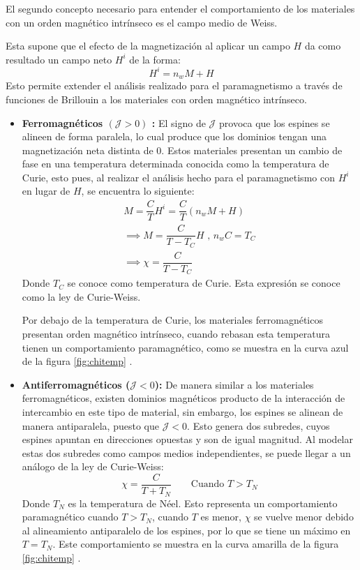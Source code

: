 \documentclass[../main.tex]{subfiles}
\begin{document}
El segundo concepto necesario para entender el comportamiento de los materiales con un orden magnético intrínseco es el campo medio de Weiss.

Esta supone que el efecto de la magnetización al aplicar un campo $H$ da como resultado un campo neto $H^i$ de la forma:
\begin{equation}
    H^i=n_wM+H
    \label{eq:Weiss}
\end{equation}
Esto permite extender el análisis realizado para el paramagnetismo a través de funciones de Brillouin a los materiales con orden magnético intrínseco.
\begin{itemize}
    \item \textbf{Ferromagnéticos $(\mathcal{J}>0)$ :} El signo de $\mathcal{J}$ provoca que los espines se alineen de forma paralela, lo cual produce que los dominios tengan una magnetización neta distinta de 0. Estos materiales presentan un cambio de fase en una temperatura determinada conocida como la temperatura de Curie, esto pues, al realizar el análisis hecho para el paramagnetismo con $H^i$ en lugar de $H$, se encuentra lo siguiente:
    \begin{equation}\begin{split}
        M=\dfrac{C}{T}H^i=\dfrac{C}{T}(n_wM+H)\\
        \implies M=\dfrac{C}{T-T_C}H\text{ , }n_wC=T_C\\
        \implies \chi=\dfrac{C}{T-T_C}
    \end{split}
        \label{eq:leycurieweiss}
    \end{equation}
    Donde $T_C$ se conoce como temperatura de Curie. Esta expresión se conoce como la ley de Curie-Weiss.

    Por debajo de la temperatura de Curie, los materiales ferromagnéticos presentan orden magnético intrínseco, cuando rebasan esta temperatura tienen un comportamiento paramagnético, como se muestra en la curva azul de la figura \ref{fig:chitemp} \cite{coey2010magnetism}.
    \item \textbf{Antiferromagnéticos ($\mathcal{J}<0$):} De manera similar a los materiales ferromagnéticos, existen dominios magnéticos producto de la interacción de intercambio en este tipo de material, sin embargo, los espines se alinean de manera antiparalela, puesto que $\mathcal{J}<0$. Esto genera dos subredes, cuyos espines apuntan en direcciones opuestas y son de igual magnitud. Al modelar estas dos subredes como campos medios independientes, se puede llegar a un análogo de la ley de Curie-Weiss:
    \begin{equation}
        \chi=\dfrac{C}{T+T_N}\qquad\text{Cuando }T>T_N
        \label{eq:tempdeneel}
    \end{equation}
    Donde $T_N$ es la temperatura de Néel. Esto representa un comportamiento paramagnético cuando $T>T_N$, cuando $T$ es menor, $\chi$ se vuelve menor debido al alineamiento antiparalelo de los espines, por lo que se tiene un máximo en $T=T_N$. Este comportamiento se muestra en la curva amarilla de la figura \ref{fig:chitemp} \cite{coey2010magnetism}.


\end{itemize}
\end{document}

